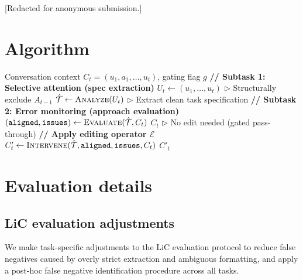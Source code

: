 \documentclass{article} %
\begin{document}
[Redacted for anonymous submission.]






\appendix

\section{Algorithm}
\label{app:algorithm}

\begin{algorithm}[h]
\caption{Context Curation via Externalized Executive Function}
\label{alg:context-edit}
\begin{algorithmic}[1]
\REQUIRE Conversation context $C_t = (u_1, a_1, \ldots, u_t)$, gating flag $g$
\STATE \textbf{// Subtask 1: Selective attention (spec extraction)}
\STATE $U_t \leftarrow (u_1, \ldots, u_t)$ \hfill $\triangleright$ Structurally exclude $A_{t-1}$
\STATE $\hat{\mathcal{T}} \leftarrow \textsc{Analyze}(U_t)$ \hfill $\triangleright$ Extract clean task specification
\STATE \textbf{// Subtask 2: Error monitoring (approach evaluation)}
\STATE $(\texttt{aligned}, \texttt{issues}) \leftarrow \textsc{Evaluate}(\hat{\mathcal{T}}, C_t)$
    \RETURN $C_t$ \hfill $\triangleright$ No edit needed (gated pass-through)
\ENDIF
\STATE \textbf{// Apply editing operator $\mathcal{E}$}
\STATE $C'_t \leftarrow \textsc{Intervene}(\hat{\mathcal{T}}, \texttt{aligned}, \texttt{issues}, C_t)$
\RETURN $C'_t$
\end{algorithmic}
\end{algorithm}


\section{Evaluation details}
\label{app:eval-details}

\subsection{LiC evaluation adjustments}
\label{app:user-sim-qc}

We make task-specific adjustments to the LiC evaluation protocol to reduce false negatives caused by overly strict extraction and ambiguous formatting, and apply a post-hoc false negative identification procedure across all tasks.
\end{document}
